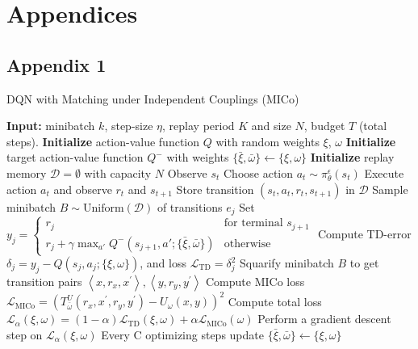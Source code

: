 \chapter{Appendices}
\section{Appendix 1}

\begin{algorithm}
\caption{DQN with Matching under Independent Couplings (MICo)}
\label{algorithm:dqn_mico}
\begin{algorithmic}[1]
\State \textbf{Input:} minibatch $k$, step-size $\eta$, replay period $K$ and size $N$, budget $T$ (total steps).
\State \textbf{Initialize} action-value function $Q$ with random weights $\xi$, $\omega$
\State \textbf{Initialize} target action-value function $Q^-$ with weights $\{\bar{\xi},\bar{\omega}\} \leftarrow \{\xi, \omega\}$
\State \textbf{Initialize} replay memory $\mathcal{D} = \emptyset$ with capacity $N$%
    \State Observe $s_t$
    \State Choose action $a_t \sim \pi^\epsilon_\theta(s_t)$
    \State Execute action $a_t$ and observe $r_t$ and $s_{t+1}$
    \State Store transition $(s_t, a_t, r_t, s_{t+1})$ in $\mathcal{D}$
        \State Sample minibatch $B \sim \text{Uniform}(\mathcal{D})$ of transitions $e_j$        %
        \State Set $y_j = 
        \begin{cases} 
            r_j & \text{for terminal } s_{j+1}\\
            r_j + \gamma \max_{a'} Q^-(s_{j+1}, a'; \{\bar{\xi},\bar{\omega}\}) & \text{otherwise}
        \end{cases}$
        \State Compute TD-error $\delta_j = y_j - Q(s_{j}, a_{j}; \{\xi, \omega\})$, and loss $\mathcal{L}_{\text{TD}} = \delta_j^2 $
        \State Squarify minibatch $B$ to get transition pairs $\left\langle x, r_x, x^{\prime}\right\rangle,\left\langle y, r_y, y^{\prime}\right\rangle$ 
        \State Compute MICo loss $\mathcal{L}_{\text{MICo}} = \left(T_{\bar{\omega}}^U\left(r_x, x^{\prime}, r_y, y^{\prime}\right)-U_\omega(x, y)\right)^2$
        \State Compute total loss $\mathcal{L}_\alpha(\xi, \omega) = (1 - \alpha) \mathcal{L}_{\text{TD}}(\xi, \omega) + \alpha \mathcal{L}_{\text{MICo}}(\omega)$
        \State Perform a gradient descent step on $\mathcal{L}_\alpha(\xi, \omega)$
        \State Every C optimizing steps update $\{\bar{\xi},\bar{\omega}\} \leftarrow \{\xi, \omega\}$
        


\end{algorithmic}
\end{algorithm}
